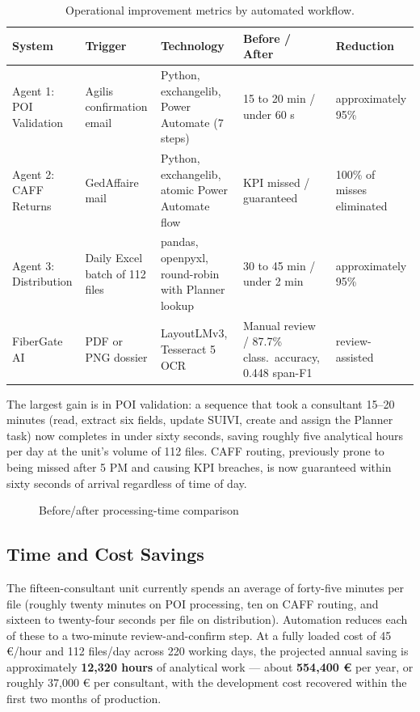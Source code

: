 \begin{table}[H]
  \centering
  \caption{Operational improvement metrics by automated workflow.}
  \renewcommand{\arraystretch}{1.0}
  \footnotesize
  \begin{tabularx}{\textwidth}{|X|X|X|X|X|}
    \hline
    \textbf{System} & \textbf{Trigger} & \textbf{Technology} & \textbf{Before / After} & \textbf{Reduction} \\ \hline
    Agent 1: POI Validation & Agilis confirmation email & Python, exchangelib, Power Automate (7 steps) & 15 to 20 min / under 60 s & approximately 95\% \\ \hline
    Agent 2: CAFF Returns & GedAffaire mail & Python, exchangelib, atomic Power Automate flow & KPI missed / guaranteed & 100\% of misses eliminated \\ \hline
    Agent 3: Distribution & Daily Excel batch of 112 files & pandas, openpyxl, round-robin with Planner lookup & 30 to 45 min / under 2 min & approximately 95\% \\ \hline
    FiberGate AI & PDF or PNG dossier & LayoutLMv3, Tesseract 5 OCR & Manual review / 87.7\% class.\ accuracy, 0.448 span-F1 & review-assisted \\ \hline
  \end{tabularx}
\end{table}

The largest gain is in POI validation: a sequence that took a consultant 15--20 minutes (read, extract six fields, update SUIVI, create and assign the Planner task) now completes in under sixty seconds, saving roughly five analytical hours per day at the unit's volume of 112 files. CAFF routing, previously prone to being missed after 5 PM and causing KPI breaches, is now guaranteed within sixty seconds of arrival regardless of time of day.

\begin{figure}[H]
  \centering
  \caption{Before/after processing-time comparison}
  \label{fig:impact-chart}
\end{figure}

\subsection{Time and Cost Savings}

The fifteen-consultant unit currently spends an average of forty-five minutes per file (roughly twenty minutes on POI processing, ten on CAFF routing, and sixteen to twenty-four seconds per file on distribution). Automation reduces each of these to a two-minute review-and-confirm step. At a fully loaded cost of 45 €/hour and 112 files/day across 220 working days, the projected annual saving is approximately \textbf{12,320 hours} of analytical work — about \textbf{554,400 €} per year, or roughly 37,000 € per consultant, with the development cost recovered within the first two months of production.

